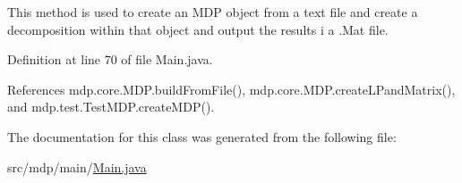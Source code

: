 This method is used to create an M\+D\+P object from a text file and create a decomposition within that object and output the results i a .Mat file. 



Definition at line 70 of file Main.\+java.



References mdp.\+core.\+M\+D\+P.\+build\+From\+File(), mdp.\+core.\+M\+D\+P.\+create\+L\+Pand\+Matrix(), and mdp.\+test.\+Test\+M\+D\+P.\+create\+M\+D\+P().



The documentation for this class was generated from the following file\+:\begin{DoxyCompactItemize}
\item 
src/mdp/main/\hyperlink{_main_8java}{Main.\+java}\end{DoxyCompactItemize}

